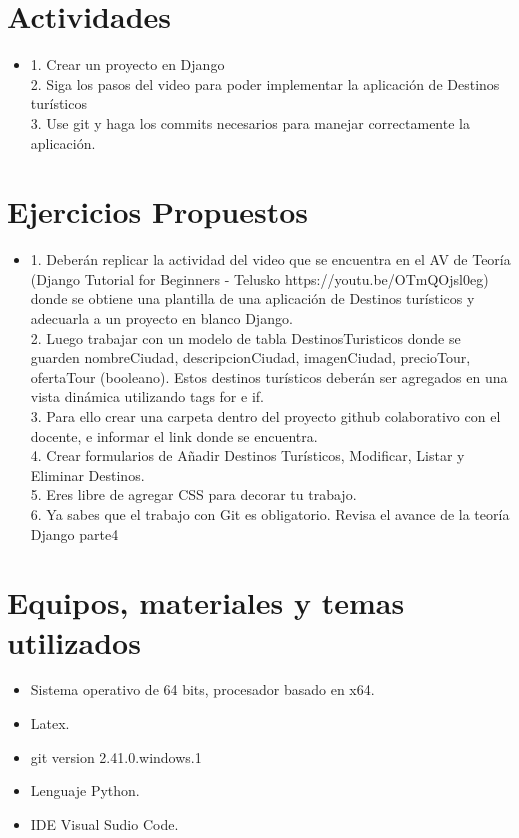 \documentclass{article}
\begin{document}
	\section{Actividades}
	\begin{itemize}		
		\item 1. Crear un proyecto en Django\\
		2. Siga los pasos del video para poder implementar la aplicación de Destinos turísticos\\
		3. Use git y haga los commits necesarios para manejar correctamente la aplicación.\\
		
		
	\end{itemize}
	
	\section{Ejercicios Propuestos}
	\begin{itemize}	
	
		\item 1. Deberán replicar la actividad del video que se encuentra en el AV de Teoría (Django Tutorial for Beginners - Telusko https://youtu.be/OTmQOjsl0eg) donde se obtiene una plantilla de una aplicación de Destinos turísticos y adecuarla a un proyecto en blanco Django.\\
		2. Luego trabajar con un modelo de tabla DestinosTuristicos donde se guarden nombreCiudad,  descripcionCiudad, imagenCiudad, precioTour, ofertaTour (booleano).  Estos destinos turísticos deberán ser agregados en una vista dinámica utilizando tags for e if.\\
		3. Para ello crear una carpeta dentro del proyecto github colaborativo con el docente, e informar el link donde se encuentra.\\
		4. Crear formularios de Añadir Destinos Turísticos, Modificar, Listar y Eliminar Destinos.\\
		5. Eres libre de agregar CSS para decorar tu trabajo.\\
		6. Ya sabes que el trabajo con Git es obligatorio.  Revisa el avance de la teoría Django parte4
		
		
	\end{itemize}
	
	\section{Equipos, materiales y temas utilizados}
	\begin{itemize}
		\item Sistema operativo de 64 bits, procesador basado en x64.
		\item Latex. 
		\item git version 2.41.0.windows.1
		\item Lenguaje Python.
		\item IDE Visual Sudio Code.
	\end{itemize}
\end{document}
